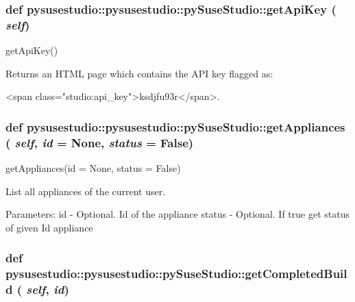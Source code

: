  \hypertarget{classpysusestudio_1_1pysusestudio_1_1py_suse_studio_a5f363a90b6b61d627d14a6f350a32889}{
\subsubsection[{getApiKey}]{\setlength{\rightskip}{0pt plus 5cm}def pysusestudio::pysusestudio::pySuseStudio::getApiKey ( {\em self})}}
\label{classpysusestudio_1_1pysusestudio_1_1py_suse_studio_a5f363a90b6b61d627d14a6f350a32889}
\begin{DoxyVerb}getApiKey()

        Returns an HTML page which contains the API key flagged as:

        <span class="studio:api_key">ksdjfu93r</span>. 
            
\end{DoxyVerb}
 \hypertarget{classpysusestudio_1_1pysusestudio_1_1py_suse_studio_a2ef486ee95ee6badd938d3a89f33a985}{
\subsubsection[{getAppliances}]{\setlength{\rightskip}{0pt plus 5cm}def pysusestudio::pysusestudio::pySuseStudio::getAppliances ( {\em self}, \/   {\em id} = {\ttfamily None}, \/   {\em status} = {\ttfamily False})}}
\label{classpysusestudio_1_1pysusestudio_1_1py_suse_studio_a2ef486ee95ee6badd938d3a89f33a985}
\begin{DoxyVerb}getAppliances(id = None, status = False)

        List all appliances of the current user.  
            
            Parameters:
id - Optional. Id of the appliance
status - Optional. If true get status of given Id appliance

\end{DoxyVerb}
 \hypertarget{classpysusestudio_1_1pysusestudio_1_1py_suse_studio_ac7f5a0a2bc51fa52ff1cd62d37c11262}{
\subsubsection[{getCompletedBuild}]{\setlength{\rightskip}{0pt plus 5cm}def pysusestudio::pysusestudio::pySuseStudio::getCompletedBuild ( {\em self}, \/   {\em id})}}
